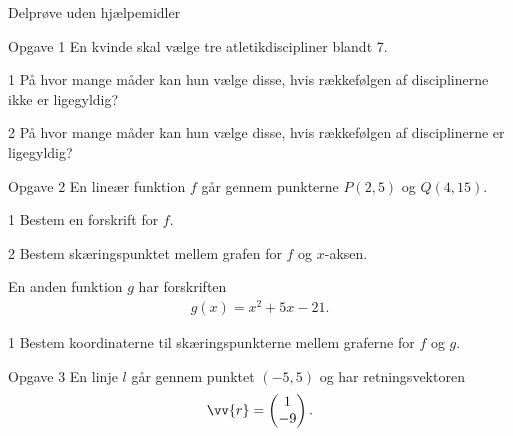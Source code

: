 \begin{center}
\LARGE
Delprøve uden hjælpemidler 
\end{center}
\begin{opgavetekst}{Opgave 1}
En kvinde skal vælge tre atletikdiscipliner blandt 7.
\end{opgavetekst}
	\begin{delopgave}{}{1}
		På hvor mange måder kan hun vælge disse, hvis rækkefølgen af disciplinerne ikke er ligegyldig?
	\end{delopgave}
	\begin{delopgave}{}{2}
		På hvor mange måder kan hun vælge disse, hvis rækkefølgen af disciplinerne er ligegyldig?
	\end{delopgave}
\begin{opgavetekst}{Opgave 2}
	En lineær funktion $f$ går gennem punkterne $P(2,5)$ og $Q(4,15)$.
\end{opgavetekst}
\begin{delopgave}{}{1}
	Bestem en forskrift for $f$. 
\end{delopgave}
\begin{delopgave}{}{2}
	Bestem skæringspunktet mellem grafen for $f$ og $x$-aksen. 
\end{delopgave}
\begin{meretekst}
	En anden funktion $g$ har forskriften 
	\begin{align*}
		g(x) = x^2+5x-21.
	\end{align*}
\end{meretekst}
\begin{delopgave}{}{1}
	Bestem koordinaterne til skæringspunkterne mellem graferne for $f$ og $g$.
\end{delopgave}
\begin{opgavetekst}{Opgave 3}
	En linje $l$ går gennem punktet $(-5,5)$ og har retningsvektoren
	\begin{align*}
		\vv{r} = 
		\begin{pmatrix}
			1 \\ -9
		\end{pmatrix}.
	\end{align*}	
\end{opgavetekst}
